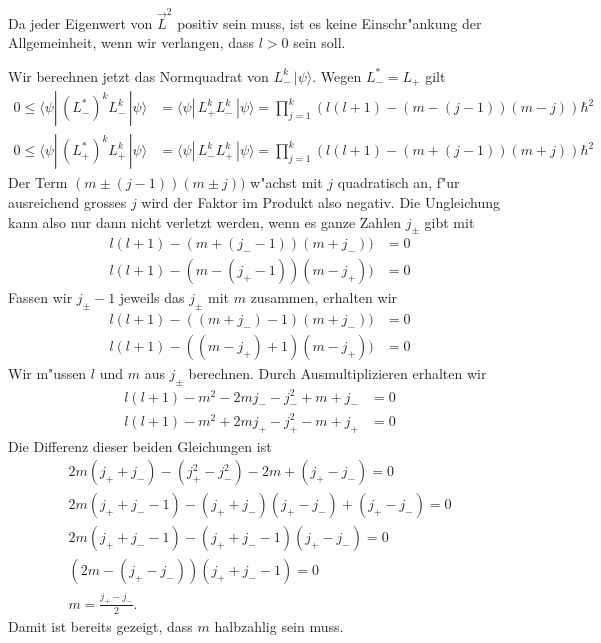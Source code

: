 Da jeder Eigenwert von $\vec L^2$ positiv sein muss, ist es keine
Einschr"ankung der Allgemeinheit, wenn wir verlangen, dass $l>0$ sein
soll.

Wir berechnen jetzt das Normquadrat von $L_-^k\,|\psi\rangle$. Wegen
$L_-^*=L_+$ gilt
\begin{align*}
0
\le
\langle\psi|\, (L_-^*)^kL_-^k\,|\psi\rangle
&=
\langle\psi|\, L_+^kL_-^k\,|\psi\rangle
=
\prod_{j=1}^k(l(l+1)-(m-(j-1))(m-j))\hbar^2
\\
0
\le
\langle\psi|\, (L_+^*)^kL_+^k\,|\psi\rangle
&=
\langle\psi|\, L_-^kL_+^k\,|\psi\rangle
=
\prod_{j=1}^k(l(l+1)-(m+(j-1))(m+j))\hbar^2
\end{align*}
Der Term $(m\pm (j-1))(m\pm j))$ w"achst mit $j$ quadratisch an, 
f"ur ausreichend grosses $j$ wird der Faktor im Produkt also negativ.
Die Ungleichung kann also nur dann nicht verletzt werden, wenn 
es ganze Zahlen $j_\pm$ gibt mit
\begin{align*}
l(l+1)-(m+(j_--1))(m+j_-))&=0
\\
l(l+1)-(m-(j_+-1))(m-j_+))&=0
\end{align*}
Fassen wir $j_\pm-1$ jeweils das $j_\pm$ mit $m$ zusammen, erhalten wir
\begin{align}
l(l+1)-((m+j_-)-1)(m+j_-))&=0
\label{skript:lmjminus}
\\
l(l+1)-((m-j_+)+1)(m-j_+))&=0
\label{skript:lmjplus}
\end{align}
Wir m"ussen $l$ und $m$ aus $j_\pm$ berechnen.
Durch Ausmultiplizieren erhalten wir
\begin{align*}
l(l+1)
-
m^2-2mj_--j_-^2+m+j_-
&=0
\\
l(l+1)
-
m^2+2mj_+-j_+^2-m+j_+
&=0
\end{align*}
Die Differenz dieser beiden Gleichungen ist
\begin{gather*}
2m(j_++j_-)-(j_+^2-j_-^2)-2m+(j_+-j_-)=0
\\
2m(j_++j_--1)-(j_++j_-)(j_+-j_-)+(j_+-j_-)=0
\\
2m(j_++j_--1)-(j_++j_--1)(j_+-j_-)=0
\\
(2m-(j_+-j_-))(j_++j_--1)=0
\\
m=\frac{j_+-j_-}2.
\end{gather*}
Damit ist bereits gezeigt, dass $m$ halbzahlig sein muss.

